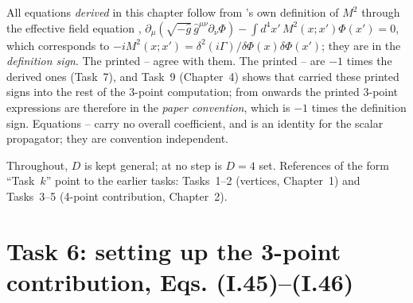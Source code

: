 \begin{notebox}
All equations \emph{derived} in this chapter follow from \PI's own definition of $M^2$ through the effective field equation ,
$\partial_\mu(\sqrt{-\hat g}\,\hat g^{\mu\nu}\partial_\nu\Phi)-\int d^4x'\,M^2(x;x')\Phi(x')=0$, which corresponds to
$-iM^2(x;x')=\delta^2(i\Gamma)/\delta\Phi(x)\delta\Phi(x')$; they are in the \emph{definition sign}.
The printed -- agree with them. The printed -- are $-1$ times the derived ones
(Task~7), and Task~9 (Chapter~4) shows that \PI{} carried these printed signs into the rest of the 3-point computation;
from  onwards the printed 3-point expressions are therefore in the \emph{paper convention}, which is $-1$ times the
definition sign. Equations -- carry no overall coefficient, and  is an identity for the scalar propagator;
they are convention independent.
\end{notebox}

Throughout, $D$ is kept general; at no step is $D=4$ set. References of the form ``Task~$k$'' point to the earlier tasks:
Tasks~1--2 (vertices, Chapter~1) and Tasks~3--5 (4-point contribution, Chapter~2).

\section{Task 6: setting up the 3-point contribution, Eqs. (I.45)--(I.46)}
\label{sec:ch3-task6}

